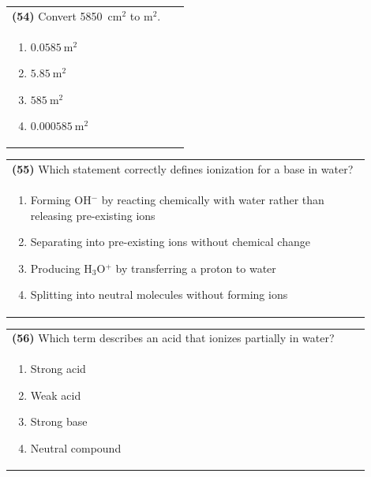 \documentclass{article}
\begin{document}
\noindent\begin{tabular}{|p{0.9\linewidth}|}
\hline
\textbf{(54)} Convert 5850~$\text{cm}^2$ to $\text{m}^2$. \\
\begin{minipage}[t]{0.85\linewidth}
\begin{enumerate}[label=\alph*.]
    \item $0.0585~\text{m}^2$
    \item $5.85~\text{m}^2$
    \item $585~\text{m}^2$
    \item $0.000585~\text{m}^2$
\end{enumerate}
\end{minipage}\\[0.2cm]
\hline
\end{tabular}

\noindent\begin{tabular}{|p{0.9\linewidth}|}
\hline
\textbf{(55)} Which statement correctly defines ionization for a base in water? \\[0.2cm]
\begin{minipage}[t]{0.85\linewidth}
\begin{enumerate}[label=\alph*.]
\item Forming OH$^-$ by reacting chemically with water rather than releasing pre-existing ions
\item Separating into pre-existing ions without chemical change
\item Producing H$_3$O$^+$ by transferring a proton to water
\item Splitting into neutral molecules without forming ions
\end{enumerate}
\end{minipage}\\[0.2cm]
\hline
\end{tabular}

\noindent\begin{tabular}{|p{0.9\linewidth}|}
\hline
\textbf{(56)} Which term describes an acid that ionizes partially in water? \\[0.2cm]
\begin{minipage}[t]{0.85\linewidth}
\begin{enumerate}[label=\alph*.]
\item Strong acid \item Weak acid \item Strong base \item Neutral compound
\end{enumerate}
\end{minipage}\\[0.2cm]
\hline
\end{tabular}
\end{document}
